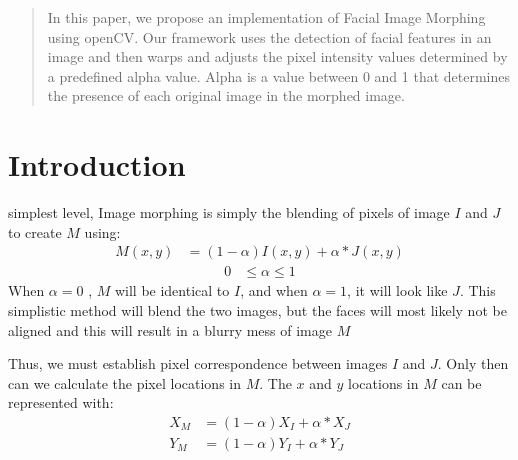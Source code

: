 \documentclass[journal]{IEEEtran}
\begin{document}




\maketitle

\begin{abstract}
In this paper, we propose an implementation of Facial Image Morphing using openCV. Our framework uses the detection of facial features in an image and then warps and adjusts the pixel intensity values determined by a predefined alpha value. Alpha is a value between 0 and 1 that determines the presence of each original image in the morphed image.
\end{abstract}



%
\IEEEpeerreviewmaketitle



\section{Introduction}
 simplest level, Image morphing is simply the blending of pixels of image $I$ and $J$ to create $M$ using: 
\begin{align} \label{eq:1}
M(x,y) &= (1-\alpha)I(x,y) + \alpha*J(x,y) 
\end{align}
\begin{align*}
0 &\leq \alpha \leq 1   
\end{align*}
When $\alpha = 0$ , $M$ will be identical to $I$, and when $\alpha =1$, it will look like $J$. This simplistic method will blend the two images, but the faces will most likely not be aligned and this will result in a blurry mess of image $M$ \newline 

Thus, we must establish pixel correspondence between images $I$ and $J$. Only then can we calculate the pixel locations in $M$. The $x$ and $y$ locations in $M$ can be represented with:
\begin{align}\label{eq:2}
X_M &= (1-\alpha)X_I + \alpha*X_J\\ \label{eq:3} 
Y_M &= (1-\alpha)Y_I + \alpha*Y_J   
\end{align}
\end{document}
